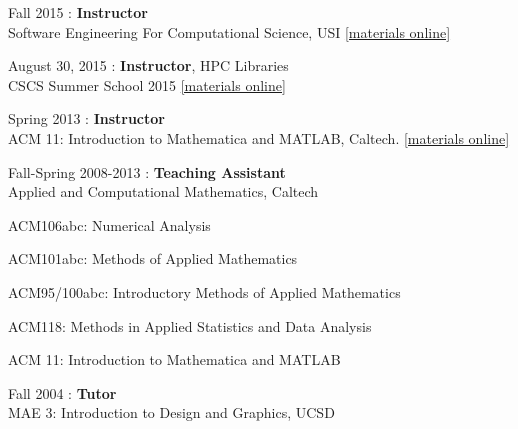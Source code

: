 \begin{samepage}
\noindent Fall 2015 : \textbf{Instructor} \\
Software Engineering For Computational Science, USI
\href{https://bitbucket.org/psanan/sefcs2015}{[materials online]}\\
\end{samepage}

\begin{samepage}
\noindent August 30, 2015 : \textbf{Instructor}, HPC Libraries \\
CSCS Summer School 2015
\href{https://github.com/eth-cscs/SummerSchool2015/tree/master/libraries}{[materials online]}\\
\end{samepage}

\begin{samepage}
\noindent Spring 2013 : \textbf{Instructor}\\
ACM 11: Introduction to Mathematica and MATLAB, Caltech.
\href{https://bitbucket.org/psanan/introduction-to-matlab-and-mathematica}{[materials online]}\\
\end{samepage}

\begin{samepage}
\noindent Fall-Spring 2008-2013 : \textbf{Teaching Assistant}\\
Applied and Computational Mathematics, Caltech
\vspace{-8pt}
\begin{tightitemize}
\item ACM106abc: Numerical Analysis
\item ACM101abc: Methods of Applied Mathematics
\item ACM95/100abc: Introductory Methods of Applied Mathematics
\item ACM118: Methods in Applied Statistics and Data Analysis
\item ACM 11: Introduction to Mathematica and MATLAB
\end{tightitemize}
\end{samepage}

\begin{samepage}
\noindent Fall 2004 : \textbf{Tutor}\\
MAE 3: Introduction to Design and Graphics, UCSD
\end{samepage}
